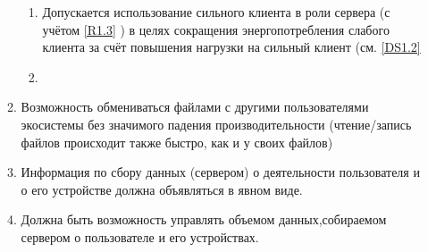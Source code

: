\begin{enumerate}[label={\bfseries ПТ-\arabic*}]
\begin{enumerate}[label*={\bfseries.\arabic*}]
\begin{enumerate}[label*={\bfseries.\arabic*}]
                     \item Допускается использование сильного клиента в роли сервера (с учётом \ref{R1.3} %
                           ) в целях сокращения энергопотребления слабого клиента за счёт повышения нагрузки на сильный клиент (см. \ref{DS1.2} %
                     \item
                  \end{enumerate}
            \item Возможность обмениваться файлами с другими пользователями экосистемы без значимого падения производительности (чтение/запись файлов происходит также быстро, как и у своих файлов)
            \item Информация по сбору данных (сервером) о деятельности пользователя и о его устройстве должна объявляться в явном виде.
            \item Должна быть возможность управлять объемом данных,собираемом сервером о пользователе и его устройствах.
         \end{enumerate}


\end{enumerate}
